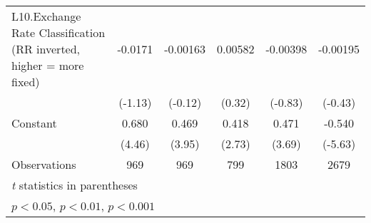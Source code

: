{\begin{longtable}{l*{5}{c}}
\addlinespace
L10.Exchange Rate Classification (RR inverted, higher = more fixed)&  -0.0171         & -0.00163         &  0.00582         & -0.00398         & -0.00195         \\
                &  (-1.13)         &  (-0.12)         &   (0.32)         &  (-0.83)         &  (-0.43)         \\
\addlinespace
Constant        &    0.680\sym{***}&    0.469\sym{***}&    0.418\sym{**} &    0.471\sym{***}&   -0.540\sym{***}\\
                &   (4.46)         &   (3.95)         &   (2.73)         &   (3.69)         &  (-5.63)         \\
\midrule
Observations    &      969         &      969         &      799         &     1803         &     2679         \\
\bottomrule
\multicolumn{6}{l}{\footnotesize \textit{t} statistics in parentheses}\\
\multicolumn{6}{l}{\footnotesize \sym{*} \(p<0.05\), \sym{**} \(p<0.01\), \sym{***} \(p<0.001\)}\\
\end{longtable}
}
